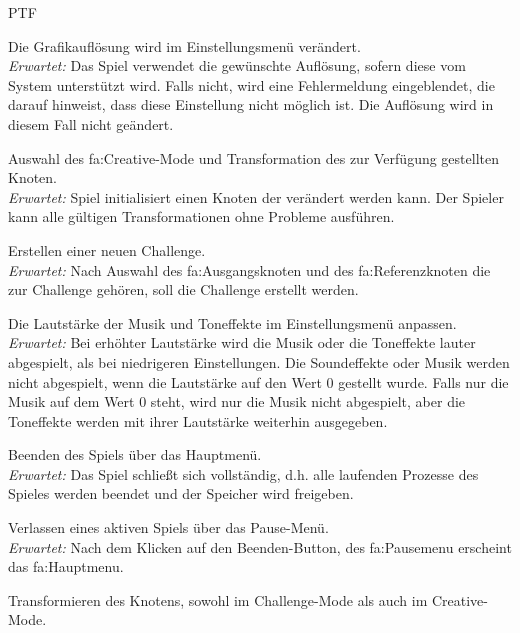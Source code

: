 	\begin{ids}{\gls{PTF}}

		\id[ 10] Die Grafikauflösung wird im Einstellungsmenü verändert.\\
		
		\textit{Erwartet:} Das Spiel verwendet die gewünschte Auflösung, sofern diese vom System unterstützt wird. Falls nicht, wird eine Fehlermeldung eingeblendet, die darauf hinweist, dass diese Einstellung nicht möglich ist. Die Auflösung wird in diesem Fall nicht geändert.

		\id[ 20] Auswahl des \gls{fa:Creative}-Mode und Transformation des zur Verfügung gestellten Knoten.\\
		
		\textit{Erwartet:} Spiel initialisiert einen Knoten der verändert werden kann. Der Spieler kann alle gültigen Transformationen ohne Probleme ausführen.

		\id[ 30] Erstellen einer neuen Challenge.\\
		
		\textit{Erwartet:} Nach Auswahl des \gls{fa:Ausgangsknoten} und des \gls{fa:Referenzknoten} die zur Challenge gehören, soll die Challenge erstellt werden.
		
		\id[ 40] Die Lautstärke der Musik und Toneffekte  im Einstellungsmenü anpassen.\\ 
		
		\textit{Erwartet:} Bei erhöhter Lautstärke wird die Musik oder die Toneffekte lauter abgespielt, als bei niedrigeren Einstellungen. Die Soundeffekte oder Musik werden nicht abgespielt, wenn die Lautstärke auf den Wert 0 gestellt wurde. Falls nur die Musik auf dem Wert 0 steht, wird nur die Musik nicht abgespielt, aber die Toneffekte werden mit ihrer Lautstärke weiterhin ausgegeben.
		
		\id[ 50] Beenden des Spiels über das Hauptmenü.\\
		
		\textit{Erwartet:} Das Spiel schließt sich vollständig, d.h. alle laufenden Prozesse des Spieles werden beendet und der Speicher wird freigeben.

		\id[ 60] Verlassen eines aktiven Spiels über das Pause-Menü.\\
		
		\textit{Erwartet:} Nach dem Klicken auf den Beenden-Button, des \gls{fa:Pausemenu} erscheint das \gls{fa:Hauptmenu}.

		\id[70] Transformieren des Knotens, sowohl im Challenge-Mode als auch im Creative-Mode.\\
		

\end{ids}

